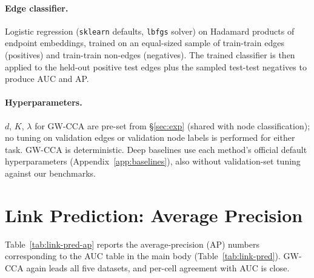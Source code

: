 \documentclass{article}
\begin{document}
\paragraph{Edge classifier.}
Logistic regression (\texttt{sklearn} defaults, \texttt{lbfgs} solver) on
Hadamard products of endpoint embeddings, trained on an equal-sized
sample of train-train edges (positives) and train-train non-edges
(negatives). The trained classifier is then applied to the held-out
positive test edges plus the sampled test-test negatives to produce AUC
and AP.

\paragraph{Hyperparameters.}
$d$, $K$, $\lambda$ for GW-CCA are pre-set from \S\ref{sec:exp} (shared
with node classification); no tuning on validation edges or validation
node labels is performed for either task. GW-CCA is deterministic. Deep
baselines use each method's official default hyperparameters
(Appendix~\ref{app:baselines}), also without validation-set tuning
against our benchmarks.

\section{Link Prediction: Average Precision}
\label{app:link-pred-ap}

Table~\ref{tab:link-pred-ap} reports the average-precision (AP) numbers
corresponding to the AUC table in the main body
(Table~\ref{tab:link-pred}). GW-CCA again leads all five datasets, and
per-cell agreement with AUC is close.
\end{document}
